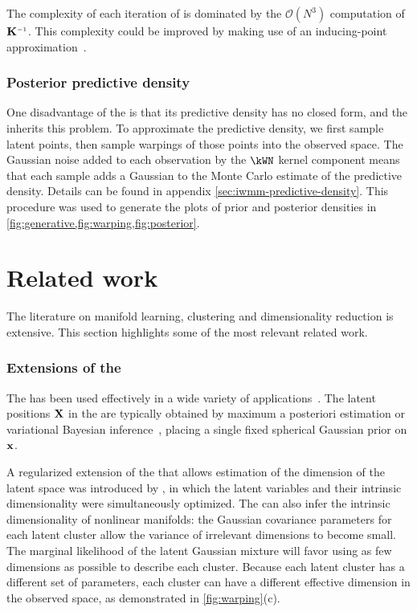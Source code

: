 The complexity of each iteration of \HMC{} is dominated by the $\mathcal{O}(N^3)$ computation of $\vK\inv$.
This complexity could be improved by making use of an inducing-point approximation~\citep{quinonero2005unifying,snelson2006sparse}.



\subsubsection{Posterior predictive density}

One disadvantage of the \gplvm{} is that its predictive density has no closed form, and the \iwmm{} inherits this problem.
To approximate the predictive density, we first sample latent points, then sample warpings of those points into the observed space. %
The Gaussian noise added to each observation by the $\kWN$ kernel component means that each sample adds a Gaussian to the Monte Carlo estimate of the predictive density.
Details can be found in appendix \ref{sec:iwmm-predictive-density}.
This procedure was used to generate the plots of prior and posterior densities in \cref{fig:generative,fig:warping,fig:posterior}.





\section{Related work}
\label{sec:iwmm-related-work}

The literature on manifold learning, clustering and dimensionality reduction is extensive.
This section highlights some of the most relevant related work.

\subsubsection{Extensions of the \sgplvm{}}

The \gplvm{} has been used effectively in a wide variety of applications~\citep{lawrence2004gaussian,salzmann2008local,lawrence2009non}.
The latent positions $\mathbf{X}$ in the \gplvm{} are typically obtained by maximum a posteriori estimation or variational Bayesian inference~\citep{titsias2010bayesian}, placing a single fixed spherical Gaussian prior on ${\bf{x}}$.

A regularized extension of the \gplvm{} that allows estimation of the dimension of the latent space was introduced by \citet{geiger2009rank}, in which the latent variables and their intrinsic dimensionality were simultaneously optimized.
The \iwmm{} can also infer the intrinsic dimensionality of nonlinear manifolds:
the Gaussian covariance parameters for each latent cluster allow the variance of irrelevant dimensions to become small.
The marginal likelihood of the latent Gaussian mixture will favor using as few dimensions as possible to describe each cluster.
Because each latent cluster has a different set of parameters, each cluster can have a different effective dimension in the observed space,
as demonstrated in \cref{fig:warping}(c).

